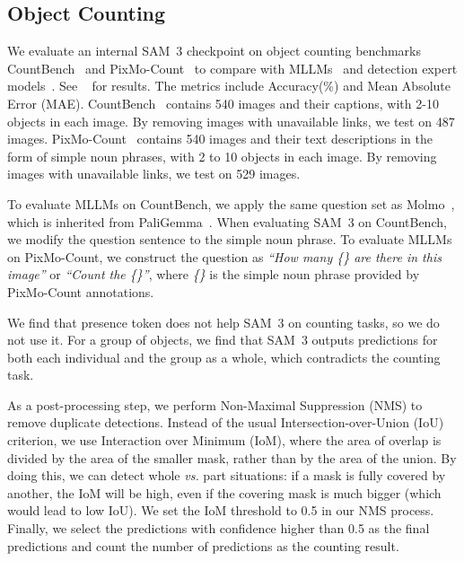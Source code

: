 \documentclass[]{fairmeta}
\newcommand{\model}{SAM~3\xspace}
\begin{document}
		\subsection{Object Counting}
		\label{app:counting}
		We evaluate an internal \model checkpoint on object counting benchmarks CountBench~\citep{countbench} and PixMo-Count~\citep{molmo} to compare with MLLMs~\citep{qwen2vl,molmo,comanici2025gemini} and detection expert models~\citep{ren2025dinoxunifiedvisionmodel}. See ~ for results. The metrics include Accuracy(\%) and Mean Absolute Error (MAE). CountBench~\citep{countbench} contains 540 images and their captions, with 2-10 objects in each image. By removing images with unavailable links, we test on 487 images. PixMo-Count~\citep{molmo} contains 540 images and their text descriptions in the form of simple noun phrases, with 2 to 10 objects in each image. By removing images with unavailable links, we test on 529 images. 
		
		To evaluate MLLMs on CountBench, we apply the same question set as Molmo~\citep{molmo}, which is inherited from PaliGemma~\citep{paligemma}. When evaluating \model on CountBench, we modify the question sentence to the simple noun phrase. To evaluate MLLMs on PixMo-Count, we construct the question as \textit{``How many \{\} are there in this image''} or \textit{``Count the \{\}''}, where \textit{\{\}} is the simple noun phrase provided by PixMo-Count annotations. 
		
		We find that presence token does not help \model on counting tasks, so we do not use it. For a group of objects, we find that \model outputs predictions for both each individual and the group as a whole, which contradicts the counting task. 
		
		As a post-processing step, we perform Non-Maximal Suppression (NMS) to remove duplicate detections. Instead of the usual Intersection-over-Union (IoU) criterion, we use Interaction over Minimum (IoM), where the area of overlap is divided by the area of the smaller mask, rather than by the area of the union. By doing this, we can detect whole \textit{vs.} part situations: if a mask is fully covered by another, the IoM will be high, even if the covering mask is much bigger (which would lead to low IoU). We set the IoM threshold to 0.5 in our NMS process. Finally, we select the predictions with confidence higher than 0.5 as the final predictions and count the number of predictions as the counting result.
		
\end{document}
